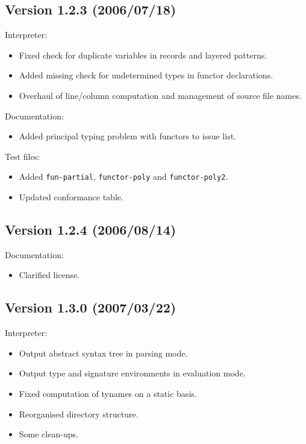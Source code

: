 \documentclass[twoside,titlepage]{article}
\begin{document}
\begin{appendix}
\subsection*{Version 1.2.3 (2006/07/18)}

Interpreter:
\begin{itemize} \setlength{\itemsep}{0em}
\item Fixed check for duplicate variables in records and layered patterns.
\item Added missing check for undetermined types in functor declarations.
\item Overhaul of line/column computation and management of source file names.
\end{itemize}

Documentation:
\begin{itemize} \setlength{\itemsep}{0em}
\item Added principal typing problem with functors to issue list.
\end{itemize}

Test files:
\begin{itemize} \setlength{\itemsep}{0em}
\item Added {\tt fun-partial}, {\tt functor-poly} and {\tt functor-poly2}.
\item Updated conformance table.
\end{itemize}

\subsection*{Version 1.2.4 (2006/08/14)}

Documentation:
\begin{itemize} \setlength{\itemsep}{0em}
\item Clarified license.
\end{itemize}

\subsection*{Version 1.3.0 (2007/03/22)}

Interpreter:
\begin{itemize} \setlength{\itemsep}{0em}
\item Output abstract syntax tree in parsing mode.
\item Output type and signature environments in evaluation mode.
\item Fixed computation of tynames on a static basis.
\item Reorganised directory structure.
\item Some clean-ups.
\end{itemize}


\end{appendix}
\end{document}
